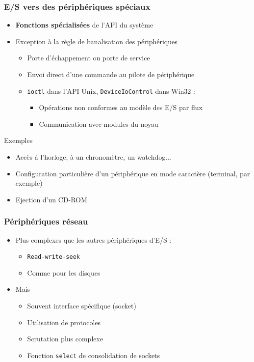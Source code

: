 \begin{frame}
\frametitle{E/S vers des périphériques spéciaux}
\begin{itemize}
\item \textbf{Fonctions spécialisées} de l'API du système
\item Exception à la règle de banalisation des périphériques
\begin{itemize}
\item Porte d'échappement ou porte de service
\item Envoi direct d'une commande au pilote de périphérique
\item \texttt{ioctl} dans l'API Unix, \texttt{DeviceIoControl} dans Win32 : 
\begin{itemize}
\item Opérations non conformes au modèle des E/S par flux
\item Communication avec modules du noyau
\end{itemize}
\end{itemize}
\end{itemize}

\begin{exampleblock}{Exemples}
\begin{itemize}
\item Accès à l'horloge, à un chronomètre, un watchdog...
\item Configuration particulière d'un périphérique en mode caractère (terminal, par exemple)
\item Ejection d'un CD-ROM
\end{itemize}
\end{exampleblock}
\end{frame}

\begin{frame}
\frametitle{Périphériques réseau}
\begin{itemize}
\item Plus complexes que les autres périphériques d'E/S :
\begin{itemize}
\item \texttt{Read-write-seek}
\item Comme pour les disques
\end{itemize}
\item Mais
\begin{itemize}
\item Souvent interface spécifique (socket)
\item Utilisation de protocoles
\item Scrutation plus complexe
\item Fonction \texttt{select} de consolidation de sockets
\end{itemize}
\end{itemize}
\end{frame}

